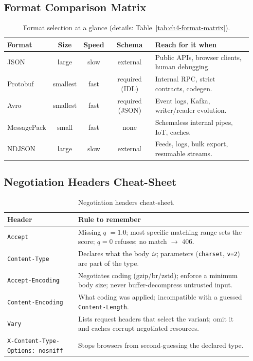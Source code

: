 \subsection*{Format Comparison Matrix}
\begin{table}[h]
  \centering
  \small
  \begin{tabularx}{\textwidth}{l c c c X}
    \toprule
    \textbf{Format} & \textbf{Size} & \textbf{Speed} & \textbf{Schema} & \textbf{Reach for it when} \\
    \midrule
    JSON & large & slow & external & Public APIs, browser clients, human debugging. \\
    Protobuf & smallest & fast & required (IDL) & Internal RPC, strict contracts, codegen. \\
    Avro & smallest & fast & required (JSON) & Event logs, Kafka, writer/reader evolution. \\
    MessagePack & small & fast & none & Schemaless internal pipes, IoT, caches. \\
    NDJSON & large & slow & external & Feeds, logs, bulk export, resumable streams. \\
    \bottomrule
  \end{tabularx}
  \caption{Format selection at a glance (details: Table~\ref{tab:ch4-format-matrix}).}
\end{table}

\subsection*{Negotiation Headers Cheat-Sheet}
\begin{table}[h]
  \centering
  \small
  \begin{tabularx}{\textwidth}{l X}
    \toprule
    \textbf{Header} & \textbf{Rule to remember} \\
    \midrule
    \texttt{Accept} & Missing $q$ $=1.0$; most specific matching range sets the score; $q{=}0$ refuses; no match $\to$ 406. \\
    \texttt{Content-Type} & Declares what the body \emph{is}; parameters (\texttt{charset}, \texttt{v=2}) are part of the type. \\
    \texttt{Accept-Encoding} & Negotiates coding (gzip/br/zstd); enforce a minimum body size; never buffer-decompress untrusted input. \\
    \texttt{Content-Encoding} & What coding was applied; incompatible with a guessed \texttt{Content-Length}. \\
    \texttt{Vary} & Lists request headers that select the variant; omit it and caches corrupt negotiated resources. \\
    \texttt{X-Content-Type-Options: nosniff} & Stops browsers from second-guessing the declared type. \\
    \bottomrule
  \end{tabularx}
  \caption{Negotiation headers cheat-sheet.}
\end{table}

